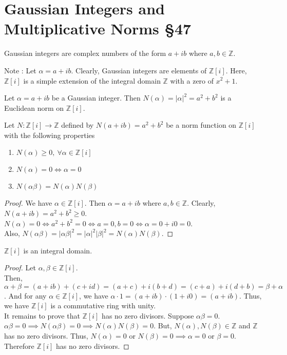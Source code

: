 \section{Gaussian Integers and Multiplicative Norms \S47}
\begin{definition}
	Gaussian integers are complex numbers of the form $a+ib$ where $a,b \in \mathbb{Z}$.
\end{definition}
Note : Let $\alpha = a+ib$.
Clearly, Gaussian integers are elements of $\mathbb{Z}[i]$.
Here, $\mathbb{Z}[i]$ is a simple extension of the integral domain $\mathbb{Z}$ with a zero of $x^2+1$.

\begin{definition}
	Let $\alpha = a+ib$ be a Gaussian integer.
	Then $N(\alpha) = |\alpha|^2 = a^2+b^2$ is a Euclidean norm on $\mathbb{Z}[i]$.
\end{definition}

\begin{lemma}
	Let $N : \mathbb{Z}[i] \to \mathbb{Z}$ defined by $N(a+ib) = a^2+b^2$ be a norm function on $\mathbb{Z}[i]$ with the following properties
	\begin{enumerate}
		\item $N(\alpha) \ge 0,\ \forall \alpha \in \mathbb{Z}[i]$
		\item $N(\alpha) = 0 \iff \alpha = 0$
		\item $N(\alpha\beta) = N(\alpha)N(\beta)$
	\end{enumerate}
\end{lemma}
\begin{proof}
	We have $\alpha \in \mathbb{Z}[i]$.
	Then $\alpha = a+ib$ where $a,b \in \mathbb{Z}$.
	Clearly, $N(a+ib) = a^2+b^2 \ge 0$.\\

	$N(\alpha) = 0 \iff a^2+b^2 = 0 \iff a=0,b=0 \iff \alpha = 0+i0 = 0$.\\

	Also, $N(\alpha\beta) = |\alpha\beta|^2 = |\alpha|^2 |\beta|^2 = N(\alpha)N(\beta)$.
\end{proof}

\begin{lemma}
	$\mathbb{Z}[i]$ is an integral domain.
\end{lemma}
\begin{proof}
	Let $\alpha, \beta \in \mathbb{Z}[i]$.\\
	Then, $\alpha + \beta = (a+ib) + (c+id) = (a+c) + i(b+d) = (c+a) + i(d+b) = \beta + \alpha$.
	And for any $\alpha \in \mathbb{Z}[i]$, we have $\alpha \cdot 1 = (a+ib) \cdot (1+i0) = (a+ib)$.
	Thus, we have $\mathbb{Z}[i]$ is a commutative ring with unity.\\

	It remains to prove that $\mathbb{Z}[i]$ has no zero divisors.
	Suppose $\alpha\beta = 0$.
	$\alpha\beta = 0 \implies N(\alpha\beta) = 0 \implies N(\alpha) N(\beta) = 0$.
	But, $N(\alpha),N(\beta) \in \mathbb{Z}$ and $\mathbb{Z}$ has no zero divisors.
	Thus, $N(\alpha) = 0$ or $N(\beta) = 0 \implies \alpha = 0$ or $\beta = 0$.
	Therefore $\mathbb{Z}[i]$ has no zero divisors.
\end{proof}

